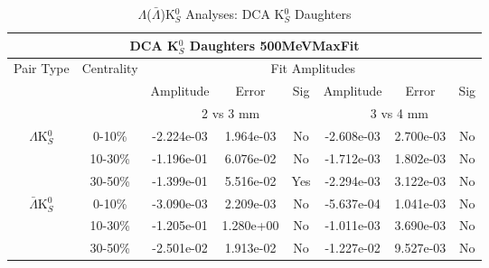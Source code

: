 \documentclass[../AnalysisNoteJBuxton.tex]{subfiles}
\begin{document}
\begin{table}
 \centering
 \begin{tabular}{|c|c|c|c|c||c|c|c|}
  \multicolumn{8}{c}{DCA K$^{0}_{S}$ Daughters 500MeVMaxFit} \\
  \hline
  \multirow{3}{*}{Pair Type} & \multirow{3}{*}{Centrality} & \multicolumn{6}{c|}{Fit Amplitudes} \\
  \cline{3-8}
   & & Amplitude & Error & Sig & Amplitude & Error & Sig \\  
  \cline{3-8}
   & & \multicolumn{3}{c||}{2 vs 3 mm} & \multicolumn{3}{c|}{3 vs 4 mm} \\  
  \hline  
  \multirow{3}{*}{$\Lambda$K$^{0}_{S}$}  
   &  0-10\% & -2.224e-03 & 1.964e-03 & No & -2.608e-03 & 2.700e-03 & No \\
   & 10-30\% & -1.196e-01 & 6.076e-02 & No & -1.712e-03 & 1.802e-03 & No \\
   & 30-50\% & -1.399e-01 & 5.516e-02 & Yes & -2.294e-03 & 3.122e-03 & No \\
  \hline  
  \multirow{3}{*}{$\bar{\Lambda}$K$^{0}_{S}$}  
   &  0-10\% & -3.090e-03 & 2.209e-03 & No & -5.637e-04 & 1.041e-03 & No \\
   & 10-30\% & -1.205e-01 & 1.280e+00 & No & -1.011e-03 & 3.690e-03 & No \\
   & 30-50\% & -2.501e-02 & 1.913e-02 & No & -1.227e-02 & 9.527e-03 & No \\
  \hline
 \end{tabular}
 \caption{$\Lambda$($\bar{\Lambda}$)K$^{0}_{S}$ Analyses: DCA K$^{0}_{S}$ Daughters}
 \label{tab:K0DaughtersDcaLamK0_500MeVMaxFit}
\end{table}
\end{document}
